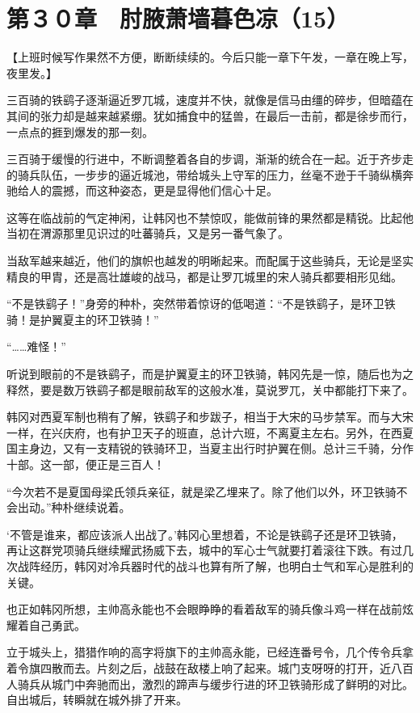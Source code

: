 \section{第３０章　肘腋萧墙暮色凉（15）}

【上班时候写作果然不方便，断断续续的。今后只能一章下午发，一章在晚上写，夜里发。】

三百骑的铁鹞子逐渐逼近罗兀城，速度并不快，就像是信马由缰的碎步，但暗蕴在其间的张力却是越来越紧绷。犹如捕食中的猛兽，在最后一击前，都是徐步而行，一点点的捱到爆发的那一刻。

三百骑于缓慢的行进中，不断调整着各自的步调，渐渐的统合在一起。近于齐步走的骑兵队伍，一步步的逼近城池，带给城头上守军的压力，丝毫不逊于千骑纵横奔驰给人的震撼，而这种姿态，更是显得他们信心十足。

这等在临战前的气定神闲，让韩冈也不禁惊叹，能做前锋的果然都是精锐。比起他当初在渭源那里见识过的吐蕃骑兵，又是另一番气象了。

当敌军越来越近，他们的旗帜也越发的明晰起来。而配属于这些骑兵，无论是坚实精良的甲胄，还是高壮雄峻的战马，都是让罗兀城里的宋人骑兵都要相形见绌。

“不是铁鹞子！”身旁的种朴，突然带着惊讶的低喝道：“不是铁鹞子，是环卫铁骑！是护翼夏主的环卫铁骑！”

“……难怪！”

听说到眼前的不是铁鹞子，而是护翼夏主的环卫铁骑，韩冈先是一惊，随后也为之释然，要是数万铁鹞子都是眼前敌军的这般水准，莫说罗兀，关中都能打下来了。

韩冈对西夏军制也稍有了解，铁鹞子和步跋子，相当于大宋的马步禁军。而与大宋一样，在兴庆府，也有护卫天子的班直，总计六班，不离夏主左右。另外，在西夏国主身边，又有一支精锐的铁骑环卫，当夏主出行时护翼在侧。总计三千骑，分作十部。这一部，便正是三百人！

“今次若不是夏国母梁氏领兵亲征，就是梁乙埋来了。除了他们以外，环卫铁骑不会出动。”种朴继续说着。

‘不管是谁来，都应该派人出战了。’韩冈心里想着，不论是铁鹞子还是环卫铁骑，再让这群党项骑兵继续耀武扬威下去，城中的军心士气就要打着滚往下跌。有过几次战阵经历，韩冈对冷兵器时代的战斗也算有所了解，也明白士气和军心是胜利的关键。

也正如韩冈所想，主帅高永能也不会眼睁睁的看着敌军的骑兵像斗鸡一样在战前炫耀着自己勇武。

立于城头上，猎猎作响的高字将旗下的主帅高永能，已经连番号令，几个传令兵拿着令旗四散而去。片刻之后，战鼓在敌楼上响了起来。城门支呀呀的打开，近八百人骑兵从城门中奔驰而出，激烈的蹄声与缓步行进的环卫铁骑形成了鲜明的对比。自出城后，转瞬就在城外排了开来。


